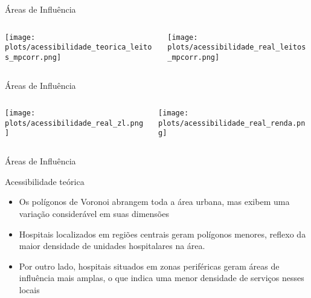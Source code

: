 \documentclass{beamer}
\begin{document}
\begin{frame}{Áreas de Influência}
    \begin{columns}
        \begin{column}{0.5\textwidth}
            \texttt{[image: plots/acessibilidade\_teorica\_leitos\_mpcorr.png]} 
        \end{column}

        \begin{column}{0.5\textwidth}
            \texttt{[image: plots/acessibilidade\_real\_leitos\_mpcorr.png]} 
        \end{column}
    \end{columns}
\end{frame}

\begin{frame}{Áreas de Influência}
    \begin{columns}
        \begin{column}{0.5\textwidth}
            \texttt{[image: plots/acessibilidade\_real\_zl.png]} 
        \end{column}

        \begin{column}{0.5\textwidth}
            \texttt{[image: plots/acessibilidade\_real\_renda.png]} 
        \end{column}
    \end{columns}
\end{frame}

\begin{frame}{Áreas de Influência}
    \begin{block}{Acessibilidade teórica}
      \begin{itemize}
        \item Os polígonos de Voronoi abrangem toda a área urbana, mas exibem uma variação considerável em suas dimensões
        \item Hospitais localizados em regiões centrais geram polígonos menores, reflexo da maior densidade de unidades hospitalares na área.
        \item Por outro lado, hospitais situados em zonas periféricas geram áreas de influência mais amplas, o que indica uma menor densidade de serviços nesses locais
      \end{itemize}
    \end{block}
\end{frame}
\end{document}
